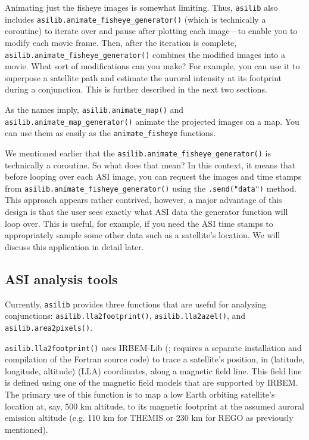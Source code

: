 \documentclass[draft]{agujournal2019}
\begin{document}
Animating just the fisheye images is somewhat limiting. Thus, \verb|asilib| also includes \verb|asilib.animate_fisheye_generator()| (which is technically a coroutine) to iterate over and pause after plotting each image---to enable you to modify each movie frame. Then, after the iteration is complete, \verb|asilib.animate_fisheye_generator()| combines the modified images into a movie. What sort of modifications can you make? For example, you can use it to superpose a satellite path and estimate the auroral intensity at its footprint during a conjunction. This is further described in the next two sections.

As the names imply, \verb|asilib.animate_map()| and \verb|asilib.animate_map_generator()| animate the projected images on a map. You can use them as easily as the \verb|animate_fisheye| functions. 

We mentioned earlier that the \verb|asilib.animate_fisheye_generator()| is technically a coroutine. So what does that mean? In this context, it means that before looping over each ASI image, you can request the images and time stamps from \verb|asilib.animate_fisheye_generator()| using the \verb|.send("data")| method. This approach appears rather contrived, however, a major advantage of this design is that the user sees exactly what ASI data the generator function will loop over. This is useful, for example, if you need the ASI time stamps to appropriately sample some other data such as a satellite's location. We will discuss this application in detail later.

\subsection{ASI analysis tools}
Currently, \verb|asilib| provides three functions that are useful for analyzing conjunctions: \verb|asilib.lla2footprint()|, \verb|asilib.lla2azel()|, and \verb|asilib.area2pixels()|.

\verb|asilib.lla2footprint()| uses IRBEM-Lib (\cite{irbem}; requires a separate installation and compilation of the Fortran source code) to trace a satellite's position, in (latitude, longitude, altitude) (LLA) coordinates, along a magnetic field line. This field line is defined using one of the magnetic field models that are supported by IRBEM. The primary use of this function is to map a low Earth orbiting satellite's location at, say, 500 km altitude, to its magnetic footprint at the assumed auroral emission altitude (e.g. 110 km for THEMIS or 230 km for REGO as previously mentioned).
\end{document}
